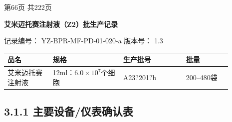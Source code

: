 \documentclass[UTF8,10pt,a4paper,fontset=fandol]{ctexart}
\newcommand{\fieldvalue}[1]{#1}
\newcommand{\handwritten}[1]{#1}
\begin{document}
\begin{center}
第66页 共222页
\end{center}

\newpage

\begin{center}
\textbf{艾米迈托赛注射液（Z2）批生产记录}
\end{center}

\noindent
记录编号：
\fieldvalue{YZ-BPR-MF-PD-01-020-a}
\hfill
版本号：
\fieldvalue{1.3}

\begin{center}
\begin{tabular}{|p{0.18\linewidth}|p{0.28\linewidth}|p{0.25\linewidth}|p{0.18\linewidth}|}
\hline
品名 & 规格 & 生产批号 & 批量 \\ \hline
\fieldvalue{艾米迈托赛注射液} &
\fieldvalue{12ml：$6.0\times10^{7}$个细胞} &
\fieldvalue{\handwritten{A23?201?b}} &
\fieldvalue{200--480袋} \\ \hline
\end{tabular}
\end{center}

\subsection*{3.1.1 主要设备/仪表确认表}
\end{document}
